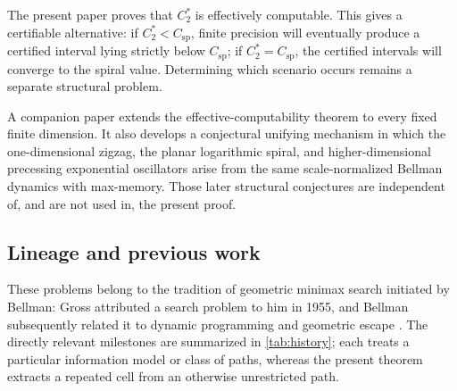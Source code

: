 \documentclass[10pt,a4paper]{article}
\theoremstyle{definition}
\theoremstyle{remark}
\newcommand{\spc}{C_{\mathrm{sp}}}
\begin{document}
The present paper proves that $C_2^*$ is effectively computable. This gives a certifiable alternative: if $C_2^*<\spc$, finite precision will eventually produce a certified interval lying strictly below $\spc$; if $C_2^*=\spc$, the certified intervals will converge to the spiral value. Determining which scenario occurs remains a separate structural problem.

A companion paper extends the effective-computability theorem to every fixed finite dimension. It also develops a conjectural unifying mechanism in which the one-dimensional zigzag, the planar logarithmic spiral, and higher-dimensional precessing exponential oscillators arise from the same scale-normalized Bellman dynamics with max-memory. Those later structural conjectures are independent of, and are not used in, the present proof.

\subsection{Lineage and previous work}
These problems belong to the tradition of geometric minimax search initiated by Bellman: Gross attributed a search problem to him in 1955, and Bellman subsequently related it to dynamic programming and geometric escape \cite{Gross,BellmanMin,BellmanDP}. The directly relevant milestones are summarized in \cref{tab:history}; each treats a particular information model or class of paths, whereas the present theorem extracts a repeated cell from an otherwise unrestricted path.
\end{document}
